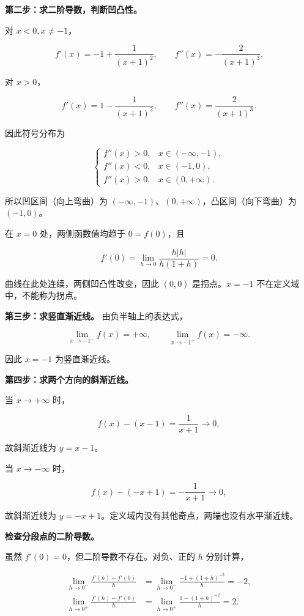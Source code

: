\documentclass[UTF8,11pt,fontset=windows]{ctexart}
\begin{document}
\textbf{第二步：求二阶导数，判断凹凸性。}

对 $x<0,x\ne-1$，

$$
f'(x)=-1+\frac1{(x+1)^2},\qquad
f''(x)=-\frac2{(x+1)^3}.
$$

对 $x>0$，

$$
f'(x)=1-\frac1{(x+1)^2},\qquad
f''(x)=\frac2{(x+1)^3}.
$$

因此符号分布为

$$
\begin{cases}
f''(x)>0,&x\in(-\infty,-1),\\
f''(x)<0,&x\in(-1,0),\\
f''(x)>0,&x\in(0,+\infty).
\end{cases}
$$

所以凹区间（向上弯曲）为 $(-\infty,-1)$、$(0,+\infty)$，凸区间（向下弯曲）为 $(-1,0)$。

在 $x=0$ 处，两侧函数值均趋于 $0=f(0)$，且

$$
f'(0)=\lim_{h\to0}\frac{h|h|}{h(1+h)}=0.
$$

曲线在此处连续，两侧凹凸性改变，因此 $(0,0)$ 是拐点。$x=-1$ 不在定义域中，不能称为拐点。

\textbf{第三步：求竖直渐近线。} 由负半轴上的表达式，

$$
\lim_{x\to-1^-}f(x)=+\infty,
\qquad \lim_{x\to-1^+}f(x)=-\infty.
$$

因此 $x=-1$ 为竖直渐近线。

\textbf{第四步：求两个方向的斜渐近线。}

当 $x\to+\infty$ 时，

$$
f(x)-(x-1)=\frac1{x+1}\longrightarrow0,
$$

故斜渐近线为 $y=x-1$。

当 $x\to-\infty$ 时，

$$
f(x)-(-x+1)=-\frac1{x+1}\longrightarrow0,
$$

故斜渐近线为 $y=-x+1$。定义域内没有其他奇点，两端也没有水平渐近线。

\textbf{检查分段点的二阶导数。}

虽然 $f'(0)=0$，但二阶导数不存在。对负、正的 $h$ 分别计算，

$$
\begin{aligned}
\lim_{h\to0^-}\frac{f'(h)-f'(0)}h
&=\lim_{h\to0^-}\frac{-1+(1+h)^{-2}}h=-2,\\
\lim_{h\to0^+}\frac{f'(h)-f'(0)}h
&=\lim_{h\to0^+}\frac{1-(1+h)^{-2}}h=2.
\end{aligned}
$$
\end{document}

